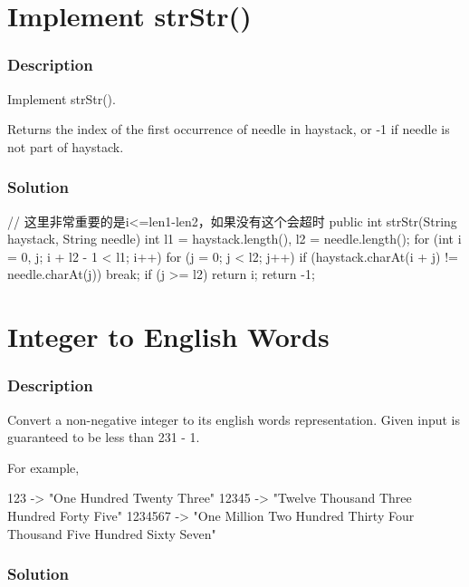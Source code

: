 \newpage

\section{Implement strStr()} %

\subsubsection{Description}
Implement strStr().

Returns the index of the first occurrence of needle in haystack, or -1 if needle is not part of haystack.

\subsubsection{Solution}

\begin{Code}
// 这里非常重要的是i<=len1-len2，如果没有这个会超时
public int strStr(String haystack, String needle) {
    int l1 = haystack.length(), l2 = needle.length();
    for (int i = 0, j; i + l2 - 1 < l1; i++) {
        for (j = 0; j < l2; j++) {
            if (haystack.charAt(i + j) != needle.charAt(j)) {
                break;
            }
        }
        if (j >= l2) {
            return i;
        }
    }
    return -1;
}
\end{Code}

\newpage

\section{Integer to English Words} %

\subsubsection{Description}
Convert a non-negative integer to its english words representation. Given input is guaranteed to be less than 231 - 1.

For example,
\begin{Code}
123 -> "One Hundred Twenty Three"
12345 -> "Twelve Thousand Three Hundred Forty Five"
1234567 -> "One Million Two Hundred Thirty Four Thousand Five Hundred Sixty Seven"
\end{Code}
\subsubsection{Solution}

